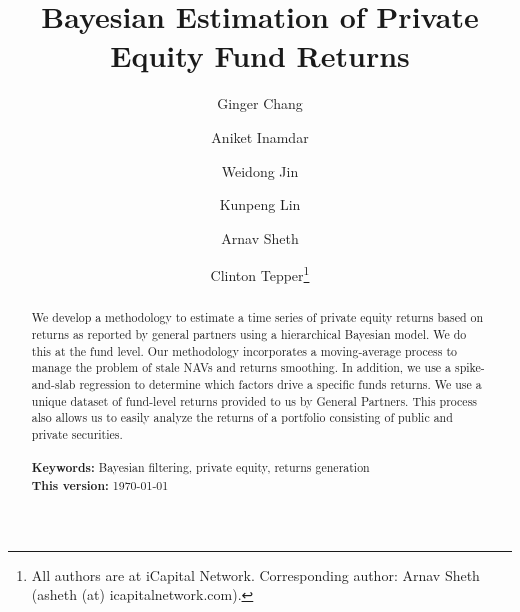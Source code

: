 \documentclass[11pt]{article}
\begin{document}
\begin{titlepage}
\title{Bayesian Estimation of Private Equity Fund Returns}
\author{Ginger Chang \and Aniket Inamdar \and Weidong Jin \and Kunpeng Lin \and Arnav Sheth \and Clinton Tepper\thanks{All authors are at iCapital Network. Corresponding author: Arnav Sheth (asheth (at) icapitalnetwork.com).}}
\date{}
\maketitle
\begin{abstract}
\noindent We develop a methodology to estimate a time series of private equity returns based on returns as reported by general partners using a hierarchical Bayesian model.  We do this at the fund level. Our methodology incorporates a moving-average process to manage the problem of stale NAVs and returns smoothing. In addition, we use a spike-and-slab regression to determine which factors drive a specific funds returns. We use a unique dataset of fund-level returns provided to us by General Partners. This process also allows us to easily analyze the returns of a portfolio consisting of public and private securities. \\
\vspace{0in}\\
\noindent\textbf{Keywords:} Bayesian filtering, private equity, returns generation\\
\noindent\textbf{This version:} \today\\

\bigskip
\end{abstract}
\setcounter{page}{0}
\thispagestyle{empty}
\end{titlepage}
\pagebreak \newpage




\doublespacing
\end{document}
